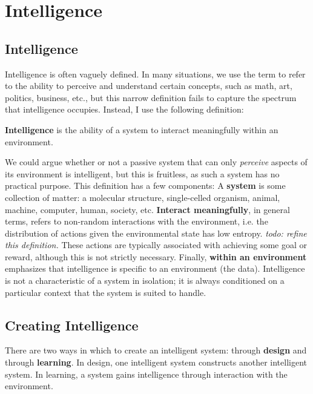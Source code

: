 \chapter{Intelligence}

\section{Intelligence}

Intelligence is often vaguely defined. In many situations, we use the term to refer to the ability to perceive and understand certain concepts, such as math, art, politics, business, etc., but this narrow definition fails to capture the spectrum that intelligence occupies. Instead, I use the following definition:

\begin{center}
	\textbf{Intelligence} is the ability of a system to interact meaningfully within an environment.
\end{center}

We could argue whether or not a passive system that can only \textit{perceive} aspects of its environment is intelligent, but this is fruitless, as such a system has no practical purpose. This definition has a few components: A \textbf{system} is some collection of matter: a molecular structure, single-celled organism, animal, machine, computer, human, society, etc. \textbf{Interact meaningfully}, in general terms, refers to non-random interactions with the environment, i.e. the distribution of actions given the environmental state has low entropy. \textit{todo: refine this definition.} These actions are typically associated with achieving some goal or reward, although this is not strictly necessary. Finally, \textbf{within an environment} emphasizes that intelligence is specific to an environment (the data). Intelligence is not a characteristic of a system in isolation; it is always conditioned on a particular context that the system is suited to handle.

\section{Creating Intelligence}

There are two ways in which to create an intelligent system: through \textbf{design} and through \textbf{learning}. In design, one intelligent system constructs another intelligent system. In learning, a system gains intelligence through interaction with the environment.